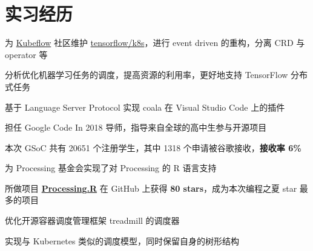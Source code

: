 \documentclass[]{deedy-resume-openfont}
\begin{document}
\begin{minipage}[t]{0.68\textwidth}


\section{实习经历}

\sectionsep
{}
\vspace{\topsep}
\begin{tightemize}
    \item 为 \href{https://github.com/kubeflow/kubeflow}{Kubeflow} 社区维护 \href{https://github.com/tensorflow/k8s}{tensorflow/k8s}，进行 event driven 的重构，分离 CRD 与 operator 等
    \item 分析优化机器学习任务的调度，提高资源的利用率，更好地支持 TensorFlow 分布式任务
\end{tightemize}
\sectionsep

\sectionsep
{}
\vspace{\topsep}
\begin{tightemize}
    \item 基于 Language Server Protocol 实现 coala 在 Visual Studio Code 上的插件
    \item 担任 Google Code In 2018 导师，指导来自全球的高中生参与开源项目
\end{tightemize}
\sectionsep

\sectionsep
{}
\vspace{\topsep}
\begin{tightemize}
    \item 本次 GSoC 共有 20651 个注册学生，其中 1318 个申请被谷歌接收，\textbf{接收率 6\%}
    \item 为 Processing 基金会实现了对 Processing 的 R 语言支持
    \item 所做项目 \href{https://github.com/gaocegege/Processing.R}{\bf Processing.R} 在 GitHub 上获得 \textbf{80 stars}，成为本次编程之夏 star 最多的项目
\end{tightemize}
\sectionsep

\begin{tightemize}
\item 优化开源容器调度管理框架 treadmill 的调度器
\item 实现与 Kubernetes 类似的调度模型，同时保留自身的树形结构
\end{tightemize}
\sectionsep


\end{minipage}
\end{document}
